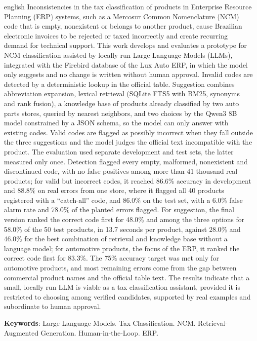 \begin{resumo}[Abstract]
\begin{otherlanguage*}{english}
\noindent
Inconsistencies in the tax classification of products in Enterprise Resource Planning (ERP) systems, such as a Mercosur Common Nomenclature (NCM) code that is empty, nonexistent or belongs to another product, cause Brazilian electronic invoices to be rejected or taxed incorrectly and create recurring demand for technical support. This work develops and evaluates a prototype for NCM classification assisted by locally run Large Language Models (LLMs), integrated with the Firebird database of the Lux Auto ERP, in which the model only suggests and no change is written without human approval. Invalid codes are detected by a deterministic lookup in the official table. Suggestion combines abbreviation expansion, lexical retrieval (SQLite FTS5 with BM25, synonyms and rank fusion), a knowledge base of products already classified by two auto parts stores, queried by nearest neighbors, and two choices by the Qwen3 8B model constrained by a JSON schema, so the model can only answer with existing codes. Valid codes are flagged as possibly incorrect when they fall outside the three suggestions and the model judges the official text incompatible with the product. The evaluation used separate development and test sets, the latter measured only once. Detection flagged every empty, malformed, nonexistent and discontinued code, with no false positives among more than 41 thousand real products; for valid but incorrect codes, it reached 86.6\% accuracy in development and 88.8\% on real errors from one store, where it flagged all 40 products registered with a ``catch-all'' code, and 86.0\% on the test set, with a 6.0\% false alarm rate and 78.0\% of the planted errors flagged. For suggestion, the final version ranked the correct code first for 48.0\% and among the three options for 58.0\% of the 50 test products, in 13.7 seconds per product, against 28.0\% and 46.0\% for the best combination of retrieval and knowledge base without a language model; for automotive products, the focus of the ERP, it ranked the correct code first for 83.3\%. The 75\% accuracy target was met only for automotive products, and most remaining errors come from the gap between commercial product names and the official table text. The results indicate that a small, locally run LLM is viable as a tax classification assistant, provided it is restricted to choosing among verified candidates, supported by real examples and subordinate to human approval.

\vspace{\onelineskip}
\noindent
\textbf{Keywords}: Large Language Models. Tax Classification. NCM. Retrieval-Augmented Generation. Human-in-the-Loop. ERP.
\end{otherlanguage*}
\end{resumo}
